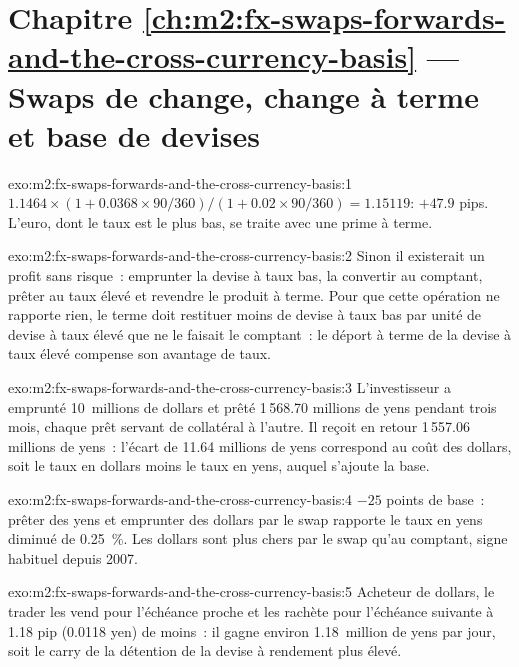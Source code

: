 \section*{Chapitre \ref{ch:m2:fx-swaps-forwards-and-the-cross-currency-basis} --- Swaps de change, change à terme et base de devises}

\begin{solution}{exo:m2:fx-swaps-forwards-and-the-cross-currency-basis:1}
$1.1464 \times (1 + 0.0368 \times 90/360)/(1 + 0.02 \times 90/360) = 1.15119$:
$+47.9$ pips. L'euro, dont le taux est le plus bas, se traite avec une prime à terme.
\end{solution}

\begin{solution}{exo:m2:fx-swaps-forwards-and-the-cross-currency-basis:2}
Sinon il existerait un profit sans risque~: emprunter la devise à taux bas, la
convertir au comptant, prêter au taux élevé et revendre le produit à terme. Pour
que cette opération ne rapporte rien, le terme doit restituer moins de devise à taux bas par unité de
devise à taux élevé que ne le faisait le comptant~: le déport à terme de la devise à taux élevé
compense son avantage de taux.
\end{solution}

\begin{solution}{exo:m2:fx-swaps-forwards-and-the-cross-currency-basis:3}
L'investisseur a emprunté 10~millions de dollars et prêté 1\,568.70 millions de yens
pendant trois mois, chaque prêt servant de collatéral à l'autre. Il reçoit en retour 1\,557.06
millions de yens~: l'écart de 11.64 millions de yens correspond au coût des dollars, soit le taux en dollars
moins le taux en yens, auquel s'ajoute la base.
\end{solution}

\begin{solution}{exo:m2:fx-swaps-forwards-and-the-cross-currency-basis:4}
$-25$ points de base~: prêter des yens et emprunter des dollars par le swap rapporte le
taux en yens diminué de 0.25~\%. Les dollars sont plus chers
par le swap qu'au comptant, signe habituel depuis 2007.
\end{solution}

\begin{solution}{exo:m2:fx-swaps-forwards-and-the-cross-currency-basis:5}
Acheteur de dollars, le trader les vend pour l'échéance proche et les rachète pour
l'échéance suivante à 1.18 pip (0.0118 yen) de moins~: il gagne environ 1.18~million de yens par jour,
soit le carry de la détention de la devise à rendement plus élevé.
\end{solution}

